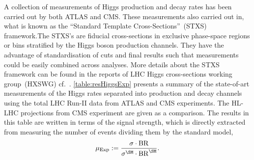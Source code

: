 A collection of measurements of Higgs production and decay rates has been carried out by both ATLAS and CMS. These measurements also carried out in, what is known as  the ``Standard Template Cross-Sections''~(STXS) framework.The STXS's are fiducial cross-sections in exclusive phase-space regions or bins stratified by the Higgs boson production channels. They have the advantage of standardisation of cuts and final results such that measurements could be easily combined across analyses. More details about the STXS framework can be found in the reports of  LHC Higgs cross-sections working group~(HXSWG) cf.~\cite{Berger:2019wnu}.  \autoref{table:resHiggsExp} presents a summary of the state-of-art measurements of the Higgs rates separated into production and decay channels using the total LHC Run-II data from ATLAS and CMS experiments. The HL-LHC projections from CMS experiment are given as a comparison. The results in this table are written in terms of the signal strength, which is directly extracted from measuring the number of events dividing them by the standard model,
\begin{equation}
	\mu_{\mathrm{Exp}} := \frac{ \sigma \cdot \mathrm{BR}}{ \sigma^{\SM} \cdot \mathrm{BR}^{\SM}}.
\end{equation}
\newpage
\begingroup
 
\endgroup
\FloatBarrier
